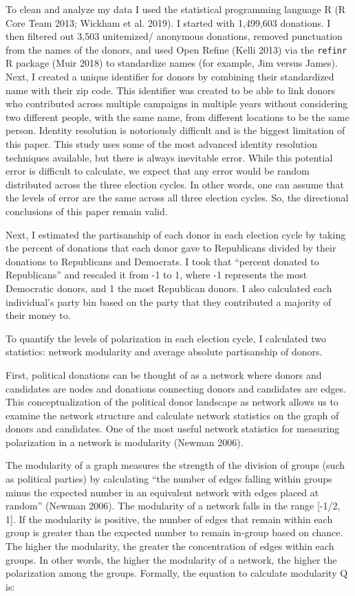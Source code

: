 \documentclass[12pt,]{article}
\begin{document}
To clean and analyze my data I used the statistical programming language
R (R Core Team 2013; Wickham et al. 2019). I started with 1,499,603
donations. I then filtered out 3,503 unitemized/ anonymous donations,
removed punctuation from the names of the donors, and used Open Refine
(Kelli 2013) via the \texttt{refinr} R package (Muir 2018) to
standardize names (for example, Jim versus James). Next, I created a
unique identifier for donors by combining their standardized name with
their zip code. This identifier was created to be able to link donors
who contributed across multiple campaigns in multiple years without
considering two different people, with the same name, from different
locations to be the same person. Identity resolution is notoriously
difficult and is the biggest limitation of this paper. This study uses
some of the most advanced identity resolution techniques available, but
there is always inevitable error. While this potential error is
difficult to calculate, we expect that any error would be random
distributed across the three election cycles. In other words, one can
assume that the levels of error are the same across all three election
cycles. So, the directional conclusions of this paper remain valid.

Next, I estimated the partisanship of each donor in each election cycle
by taking the percent of donations that each donor gave to Republicans
divided by their donations to Republicans and Democrats. I took that
``percent donated to Republicans'' and rescaled it from -1 to 1, where
-1 represents the most Democratic donors, and 1 the most Republican
donors. I also calculated each individual's party bin based on the party
that they contributed a majority of their money to.

To quantify the levels of polarization in each election cycle, I
calculated two statistics: network modularity and average absolute
partisanship of donors.

First, political donations can be thought of as a network where donors
and candidates are nodes and donations connecting donors and candidates
are edges. This conceptualization of the political donor landscape as
network allows us to examine the network structure and calculate network
statistics on the graph of donors and candidates. One of the most useful
network statistics for measuring polarization in a network is modularity
(Newman 2006).

The modularity of a graph measures the strength of the division of
groups (such as political parties) by calculating ``the number of edges
falling within groups minus the expected number in an equivalent network
with edges placed at random'' (Newman 2006). The modularity of a network
falls in the range {[}-1/2, 1{]}. If the modularity is positive, the
number of edges that remain within each group is greater than the
expected number to remain in-group based on chance. The higher the
modularity, the greater the concentration of edges within each groups.
In other words, the higher the modularity of a network, the higher the
polarization among the groups. Formally, the equation to calculate
modularity Q is:
\end{document}
